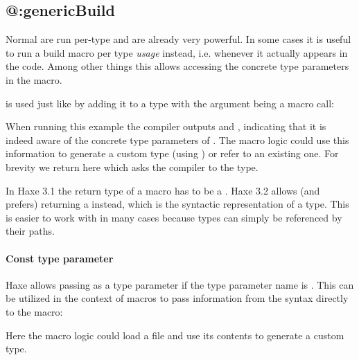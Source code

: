 \subsection{@:genericBuild}
\label{macro-generic-build}

Normal  are run per-type and are already very powerful. In some cases it is useful to run a build macro per type \emph{usage} instead, i.e. whenever it actually appears in the code. Among other things this allows accessing the concrete type parameters in the macro.

 is used just like  by adding it to a type with the argument being a macro call:



When running this example the compiler outputs  and , indicating that it is indeed aware of the concrete type parameters of . The macro logic could use this information to generate a custom type (using ) or refer to an existing one. For brevity we return  here which asks the compiler to  the type.

In Haxe 3.1 the return type of a  macro has to be a . Haxe 3.2 allows (and prefers) returning a  instead, which is the syntactic representation of a type. This is easier to work with in many cases because types can simply be referenced by their paths.

\paragraph{Const type parameter}

Haxe allows passing  as a type parameter if the type parameter name is . This can be utilized in the context of  macros to pass information from the syntax directly to the macro:



Here the macro logic could load a file and use its contents to generate a custom type.



